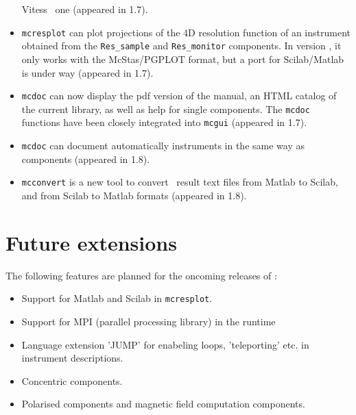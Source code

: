 \begin{itemize}
   Vitess~\cite{vitess_webpage} one (appeared in 1.7). 
\item \verb+mcresplot+ can plot projections of the 4D resolution function of an 
   instrument obtained from the \verb+Res_sample+ and \verb+Res_monitor+ components.
   In version \version, it only works with the McStas/PGPLOT format, 
   but a port for Scilab/Matlab is under way (appeared in 1.7). 
\item \verb+mcdoc+ can now display the pdf version of the manual, an
  HTML catalog of the current library, as well as help for single
  components.  The \verb+mcdoc+ functions have been
  closely integrated into \verb+mcgui+ (appeared in 1.7). 
\item \verb+mcdoc+ can document automatically instruments in the same way as components
 (appeared in 1.8).
\item \verb+mcconvert+ is a new tool to convert \MCS\ result text files from Matlab to Scilab, 
  and from Scilab to Matlab formats (appeared in 1.8). 
\end{itemize}

\section{Future extensions}
\label{s:future}
The following features are planned for the oncoming releases of \MCS :
\begin{itemize}
\item Support for Matlab and Scilab in \verb+mcresplot+.
\item Support for MPI (parallel processing library) in the runtime
\item Language extension 'JUMP' for enabeling loops, 'teleporting'
  etc. in instrument descriptions.
\item Concentric components.
\item Polarised components and magnetic field computation components.
\end{itemize}








